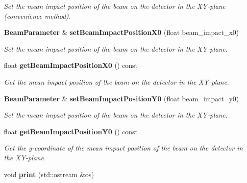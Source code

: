 \begin{DoxyCompactItemize}
\begin{DoxyCompactList}\small\item\em Set the mean impact position of the beam on the detector in the XY-\/plane (convenience method). \item\end{DoxyCompactList}\item 
{\bf BeamParameter} \& {\bf setBeamImpactPositionX0} (float beam\_\-impact\_\-x0)\label{classCALICE_1_1BeamParameter_a1ec83a4202220110e1f149dae22e6a60}

\begin{DoxyCompactList}\small\item\em Set the mean impact position of the beam on the detector in the XY-\/plane. \item\end{DoxyCompactList}\item 
float {\bf getBeamImpactPositionX0} () const \label{classCALICE_1_1BeamParameter_a3f9caa58f8a6b1dcc3b2a2effc056221}

\begin{DoxyCompactList}\small\item\em Get the mean impact position of the beam on the detector in the XY-\/plane. \item\end{DoxyCompactList}\item 
{\bf BeamParameter} \& {\bf setBeamImpactPositionY0} (float beam\_\-impact\_\-y0)\label{classCALICE_1_1BeamParameter_a21742c669e7e1319b384a56b9dad9d25}

\begin{DoxyCompactList}\small\item\em Set the mean impact position of the beam on the detector in the XY-\/plane. \item\end{DoxyCompactList}\item 
float {\bf getBeamImpactPositionY0} () const \label{classCALICE_1_1BeamParameter_a467abe590bc12553cfc297744aeece5c}

\begin{DoxyCompactList}\small\item\em Get the y-\/coordinate of the mean impact position of the beam on the detector in the XY-\/plane. \item\end{DoxyCompactList}\item 
void {\bf print} (std::ostream \&os)\label{classCALICE_1_1BeamParameter_a17b85ed30ff0f0d9eb1b2d1935ef9bed}


\end{DoxyCompactItemize}
